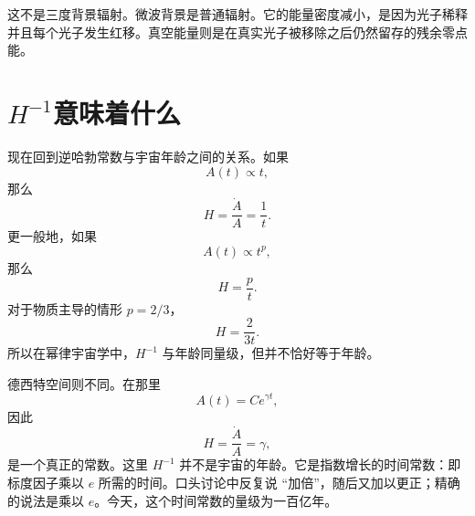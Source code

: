 \begin{classroomqa}
\end{classroomqa}

这不是三度背景辐射。微波背景是普通辐射。它的能量密度减小，是因为光子稀释并且每个光子发生红移。真空能量则是在真实光子被移除之后仍然留存的残余零点能。

\section{\(H^{-1}\)意味着什么}

现在回到逆哈勃常数与宇宙年龄之间的关系。如果
\begin{equation}
A(t)\propto t,
\end{equation}
那么
\begin{equation}
H=\frac{\dot A}{A}=\frac{1}{t}.
\end{equation}
更一般地，如果
\begin{equation}
A(t)\propto t^p,
\end{equation}
那么
\begin{equation}
H=\frac{p}{t}.
\end{equation}
对于物质主导的情形 \(p=2/3\)，
\begin{equation}
H=\frac{2}{3t}.
\end{equation}
所以在幂律宇宙学中，\(H^{-1}\) 与年龄同量级，但并不恰好等于年龄。

德西特空间则不同。在那里
\begin{equation}
A(t)=C e^{\gamma t},
\end{equation}
因此
\begin{equation}
H=\frac{\dot A}{A}=\gamma,
\end{equation}
是一个真正的常数。这里 \(H^{-1}\) 并不是宇宙的年龄。它是指数增长的时间常数：即标度因子乘以 \(e\) 所需的时间。口头讨论中反复说 ``加倍''，随后又加以更正；精确的说法是乘以 \(e\)。今天，这个时间常数的量级为一百亿年。

\begin{classroomqa}
\end{classroomqa}

